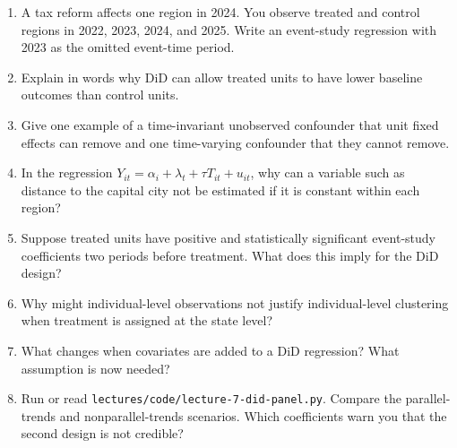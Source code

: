 \begin{enumerate}
    \item A tax reform affects one region in 2024. You observe treated and
    control regions in 2022, 2023, 2024, and 2025. Write an event-study
    regression with 2023 as the omitted event-time period.
    \item Explain in words why DiD can allow treated units to have lower baseline
    outcomes than control units.
    \item Give one example of a time-invariant unobserved confounder that unit
    fixed effects can remove and one time-varying confounder that they cannot
    remove.
    \item In the regression $Y_{it}=\alpha_i+\lambda_t+\tau T_{it}+u_{it}$, why
    can a variable such as distance to the capital city not be estimated if it is
    constant within each region?
    \item Suppose treated units have positive and statistically significant
    event-study coefficients two periods before treatment. What does this imply
    for the DiD design?
    \item Why might individual-level observations not justify individual-level
    clustering when treatment is assigned at the state level?
    \item What changes when covariates are added to a DiD regression? What
    assumption is now needed?
    \item Run or read \texttt{lectures/code/lecture-7-did-panel.py}. Compare the
    parallel-trends and nonparallel-trends scenarios. Which coefficients warn
    you that the second design is not credible?
\end{enumerate}


